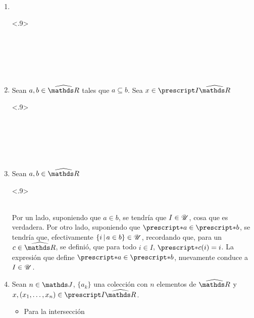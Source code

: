 \begin{demo}~
  \begin{enumerate}
    \item~
          \begin{longderivation}<.9>
              \\
            \equiv\\
              \\
            \equiv\\
              \res{ \varnothing \in \U }\\
            \equiv\\
          \end{longderivation}
    \item Sean $a,b\in\Rh$ tales que $a\subseteq b$. Sea $x\in\IRh$
          \begin{longderivation}<.9>
              \\
            \equiv\\
              \\
            \\
              \\
            \equiv\\
          \end{longderivation}
    \item Sean $a,b\in\Rh$
          \begin{longderivation}<.9>
              \\
            \equiv\\
          \end{longderivation}
          Por un lado, suponiendo que $a\in b$, se tendría que $I\in\mathscr{U}$,
          cosa que es verdadera. Por otro lado, suponiendo que $\st{a} \in \st{b}$,
          se tendría que, efectivamente $\{i\,|\,a \in b\}\in\mathscr{U}$, recordando que,
          para un $c\in\Rh$, se definió, que para todo $i\in I$, $\st{c}(i) = i$.
          La expresión que define $\st{a} \in \st{b}$, nuevamente conduce a $I\in\mathscr{U}$.
    \item Sean $n\in\J$, $\{a_k\}$ una colección con $n$ elementos de
          $\Rh$ y $x, (x_1,\dots,x_n)\in\IRh$.
          \begin{itemize}
            \item Para la intersección
            

\end{itemize}
\end{enumerate}
\end{demo}
